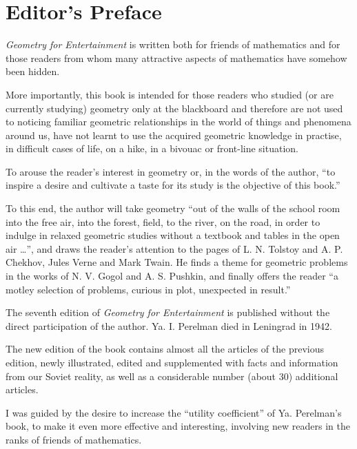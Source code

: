 \cleardoublepage

 \tableofcontents
 
 \cleardoublepage

\chapter{Editor's Preface}
\label{editor-preface}


\emph{Geometry for Entertainment} is written both for friends of mathematics and for those readers from whom many attractive aspects of mathematics have somehow been hidden.

More importantly, this book is intended for those readers who studied (or are currently studying) geometry only at the blackboard and therefore are not used to noticing familiar geometric relationships in the world of things and phenomena around us, have not learnt to use the acquired geometric knowledge in practise, in difficult cases of life, on a hike, in a bivouac or front-line situation.

To arouse the reader's interest in geometry or, in the words of the author, ``to inspire a desire and cultivate a taste for its study is the objective of this book.''

To this end, the author will take geometry ``out of the walls of the school room into the free air, into the forest, field, to the river, on the road, in order to indulge in relaxed geometric studies without a textbook and tables in the open air \ldots{}'', and draws the reader's attention to the pages of L. N. Tolstoy and A. P. Chekhov, Jules Verne and Mark Twain. He finds a theme for geometric problems in the works of N. V. Gogol and A. S. Pushkin, and finally offers the reader ``a motley selection of problems, curious in plot, unexpected in result.''

The seventh edition of \emph{Geometry for Entertainment} is published without the direct participation of the author. Ya. I. Perelman died in Leningrad in 1942.

The new edition of the book contains almost all the articles of the previous edition, newly illustrated, edited and supplemented with facts and information from our Soviet reality, as well as a considerable number (about 30) additional articles.

I was guided by the desire to increase the ``utility coefficient'' of Ya. Perelman's book, to make it even more effective and interesting, involving new readers in the ranks of friends of mathematics.


